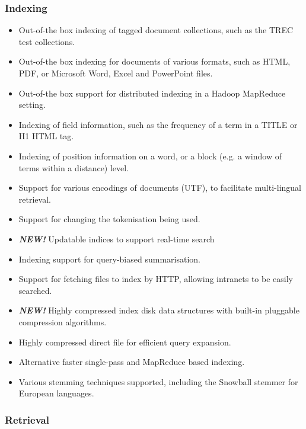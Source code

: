 \subsubsection{Indexing}\label{indexing}

\begin{itemize}
\tightlist
\item
  Out-of-the box indexing of tagged document collections, such as the
  TREC test collections.
\item
  Out-of-the box indexing for documents of various formats, such as
  HTML, PDF, or Microsoft Word, Excel and PowerPoint files.
\item
  Out-of-the box support for distributed indexing in a Hadoop MapReduce
  setting.
\item
  Indexing of field information, such as the frequency of a term in a
  TITLE or H1 HTML tag.
\item
  Indexing of position information on a word, or a block (e.g. a window
  of terms within a distance) level.
\item
  Support for various encodings of documents (UTF), to facilitate
  multi-lingual retrieval.
\item
  Support for changing the tokenisation being used.
\item
  \emph{\textbf{NEW!}} Updatable indices to support real-time search
\item
  Indexing support for query-biased summarisation.
\item
  Support for fetching files to index by HTTP, allowing intranets to be
  easily searched.
\item
  \emph{\textbf{NEW!}} Highly compressed index disk data structures with
  built-in pluggable compression algorithms.
\item
  Highly compressed direct file for efficient query expansion.
\item
  Alternative faster single-pass and MapReduce based indexing.
\item
  Various stemming techniques supported, including the Snowball stemmer
  for European languages.
\end{itemize}

\subsubsection{Retrieval}\label{retrieval}

